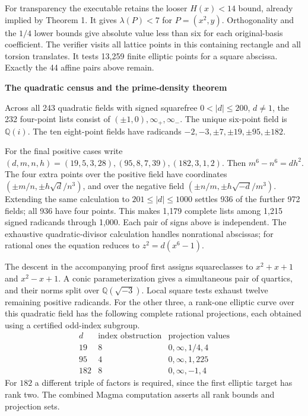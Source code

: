 \documentclass[12pt]{article}
\newcommand{\Q}{\mathbb Q}\newcommand{\Z}{\mathbb Z}\newcommand{\C}{C_6}
\newcommand{\heading}[1]{{\Large\bfseries\color{ink}#1}\par\smallskip}
\begin{document}
For transparency the executable retains the looser $H(x)<14$ bound, already implied by Theorem 1. It gives $\lambda(P)<7$ for $P=(x^2,y)$. Orthogonality and the $1/4$ lower bounds give absolute value less than six for each original-basis coefficient. The verifier visits all lattice points in this containing rectangle and all torsion translates. It tests 13,259 finite elliptic points for a square abscissa. Exactly the 44 affine pairs above remain.

\newpage
\heading{The quadratic census and the prime-density theorem}
Across all 243 quadratic fields with signed squarefree $0<|d|\le200$, $d\ne1$, the 232 four-point lists consist of $(\pm1,0),\infty_+,\infty_-$. The unique six-point field is $\Q(i)$. The ten eight-point fields have radicands $-2,-3,\pm7,\pm19,\pm95,\pm182$.

For the final positive cases write $(d,m,n,h)=(19,5,3,28),(95,8,7,39),(182,3,1,2)$. Then $m^6-n^6=dh^2$. The four extra points over the positive field have coordinates $(\pm m/n,\pm h\sqrt d/n^3)$, and over the negative field $(\pm n/m,\pm h\sqrt{-d}/m^3)$. Extending the same calculation to $201\le |d|\le1000$ settles 936 of the further 972 fields; all 936 have four points. This makes 1,179 complete lists among 1,215 signed radicands through 1,000. Each pair of signs above is independent. The exhaustive quadratic-divisor calculation handles nonrational abscissas; for rational ones the equation reduces to $z^2=d(x^6-1)$.

The descent in the accompanying proof first assigns squareclasses to $x^2+x+1$ and $x^2-x+1$. A conic parameterization gives a simultaneous pair of quartics, and their norms split over $\Q(\sqrt{-3})$. Local square tests exhaust twelve remaining positive radicands. For the other three, a rank-one elliptic curve over this quadratic field has the following complete rational projections, each obtained using a certified odd-index subgroup.
\[
\begin{array}{c|c|c}
d & \text{index obstruction} & \text{projection values}\\ \hline
19&8&0,\infty,1/4,4\\
95&4&0,\infty,1,225\\
182&8&0,\infty,-1,4
\end{array}
\]
For $182$ a different triple of factors is required, since the first elliptic target has rank two. The combined Magma computation asserts all rank bounds and projection sets.
\end{document}
